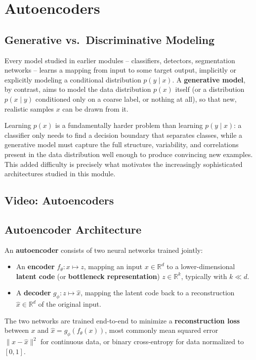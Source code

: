 \documentclass[12pt,a4paper]{article}
\begin{document}
\newpage

\section{Autoencoders}

\subsection{Generative vs.\ Discriminative Modeling}

Every model studied in earlier modules -- classifiers, detectors, segmentation networks -- learns a mapping from input to some target output, implicitly or explicitly modeling a conditional distribution $p(y \mid x)$. A \textbf{generative model}, by contrast, aims to model the data distribution $p(x)$ itself (or a distribution $p(x \mid y)$ conditioned only on a coarse label, or nothing at all), so that new, realistic samples $x$ can be drawn from it.

\begin{keyidea}
Learning $p(x)$ is a fundamentally harder problem than learning $p(y\mid x)$: a classifier only needs to find a decision boundary that separates classes, while a generative model must capture the full structure, variability, and correlations present in the data distribution well enough to produce convincing new examples. This added difficulty is precisely what motivates the increasingly sophisticated architectures studied in this module.
\end{keyidea}

\subsection{Video: Autoencoders}

\subsection{Autoencoder Architecture}

\begin{defbox}
An \textbf{autoencoder} consists of two neural networks trained jointly:
\begin{itemize}[leftmargin=1.5em]
    \item An \textbf{encoder} $f_\theta: x \mapsto z$, mapping an input $x \in \mathbb{R}^d$ to a lower-dimensional \textbf{latent code} (or \textbf{bottleneck representation}) $z \in \mathbb{R}^k$, typically with $k \ll d$.
    \item A \textbf{decoder} $g_\phi: z \mapsto \hat x$, mapping the latent code back to a reconstruction $\hat x \in \mathbb{R}^d$ of the original input.
\end{itemize}
The two networks are trained end-to-end to minimize a \textbf{reconstruction loss} between $x$ and $\hat x = g_\phi(f_\theta(x))$, most commonly mean squared error $\|x - \hat x\|^2$ for continuous data, or binary cross-entropy for data normalized to $[0,1]$.
\end{defbox}
\end{document}
